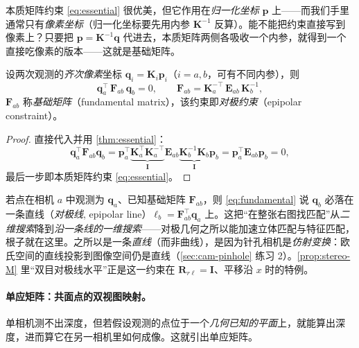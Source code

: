 \noindent 本质矩阵约束 \cref{eq:essential} 很优美，但它作用在\emph{归一化坐标} $\mathbf{p}$ 上——而我们手里通常只有\emph{像素坐标}（归一化坐标要先用内参 $\mathbf{K}^{-1}$ 反算）。能不能把约束直接写到像素上？只要把 $\mathbf{p}=\mathbf{K}^{-1}\mathbf{q}$ 代进去，本质矩阵两侧各吸收一个内参，就得到一个直接吃像素的版本——这就是基础矩阵。

\begin{theorem}[基础矩阵与对极线]\label{thm:fundamental}
设两次观测的\emph{齐次像素}坐标 $\mathbf{q}_i=\mathbf{K}_i\mathbf{p}_i$（$i=a,b$，可有不同内参），则
\begin{equation}
  \mathbf{q}_a^\top\,\mathbf{F}_{ab}\,\mathbf{q}_b=0,\qquad
  \mathbf{F}_{ab}=\mathbf{K}_a^{-\top}\,\mathbf{E}_{ab}\,\mathbf{K}_b^{-1},
  \label{eq:fundamental}
\end{equation}
$\mathbf{F}_{ab}$ 称\emph{基础矩阵}（fundamental matrix），该约束即\emph{对极约束}（epipolar constraint）。
\end{theorem}
\begin{proof}
直接代入并用 \cref{thm:essential}\cite{barfoot2024state}：
\[
  \mathbf{q}_a^\top\mathbf{F}_{ab}\mathbf{q}_b
  =\mathbf{p}_a^\top\underbrace{\mathbf{K}_a^\top\mathbf{K}_a^{-\top}}_{\mathbf{I}}\mathbf{E}_{ab}
  \underbrace{\mathbf{K}_b^{-1}\mathbf{K}_b}_{\mathbf{I}}\mathbf{p}_b
  =\mathbf{p}_a^\top\mathbf{E}_{ab}\mathbf{p}_b=0,
\]
最后一步即本质矩阵约束 \cref{eq:essential}。
\end{proof}

\begin{insight}[对极约束把匹配搜索从二维降到一维]
若点在相机 $a$ 中观测为 $\mathbf{q}_a$、已知基础矩阵 $\mathbf{F}_{ab}$，则 \cref{eq:fundamental} 说 $\mathbf{q}_b$ 必落在一条直线（\emph{对极线}, epipolar line）$\boldsymbol\ell_b=\mathbf{F}_{ab}^\top\mathbf{q}_a$ 上\cite{barfoot2024state}。这把“在整张右图找匹配”从\emph{二维搜索}降到\emph{沿一条线的一维搜索}——对极几何之所以能加速立体匹配与特征匹配，根子就在这里。之所以是一条\emph{直线}（而非曲线），是因为针孔相机是\emph{仿射变换}：欧氏空间的直线投影到图像空间仍是直线（\cref{sec:cam-pinhole} 练习 2）。\cref{prop:stereo-M} 里“双目对极线水平”正是这一约束在 $\mathbf{R}_{r\ell}=\mathbf{I}$、平移沿 $x$ 时的特例。
\end{insight}

\paragraph{单应矩阵：共面点的双视图映射。}
单相机测不出深度，但若假设观测的点位于一个\emph{几何已知的平面}上，就能算出深度，进而算它在另一相机里如何成像。这就引出单应矩阵\cite{barfoot2024state}。

